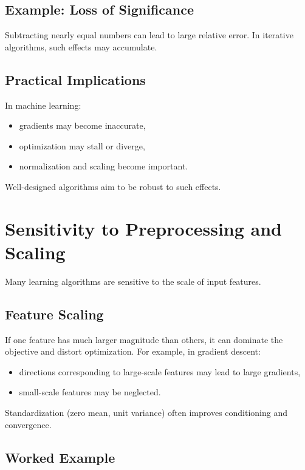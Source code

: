 \subsection{Example: Loss of Significance}

Subtracting nearly equal numbers can lead to large relative error. In iterative algorithms, such effects may accumulate.

\subsection{Practical Implications}

In machine learning:
\begin{itemize}
    \item gradients may become inaccurate,
    \item optimization may stall or diverge,
    \item normalization and scaling become important.
\end{itemize}

Well-designed algorithms aim to be robust to such effects.

\section{Sensitivity to Preprocessing and Scaling}

Many learning algorithms are sensitive to the scale of input features.

\subsection{Feature Scaling}

If one feature has much larger magnitude than others, it can dominate the objective and distort optimization. For example, in gradient descent:
\begin{itemize}
    \item directions corresponding to large-scale features may lead to large gradients,
    \item small-scale features may be neglected.
\end{itemize}

Standardization (zero mean, unit variance) often improves conditioning and convergence.

\subsection{Worked Example}

